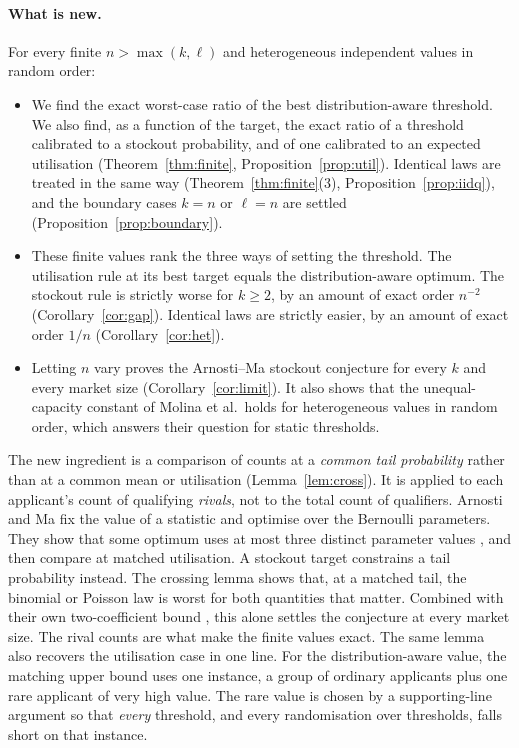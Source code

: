 \documentclass[11pt,a4paper]{article}
\theoremstyle{remark}
\begin{document}
\paragraph{What is new.}
For every finite $n>\max(k,\ell)$ and heterogeneous independent values in random order:
\begin{itemize}
\item We find the exact worst-case ratio of the best distribution-aware threshold. We also find, as a function of the target, the exact ratio of a threshold calibrated to a stockout probability, and of one calibrated to an expected utilisation (Theorem~\ref{thm:finite}, Proposition~\ref{prop:util}). Identical laws are treated in the same way (Theorem~\ref{thm:finite}(3), Proposition~\ref{prop:iidq}), and the boundary cases $k=n$ or $\ell=n$ are settled (Proposition~\ref{prop:boundary}).
\item These finite values rank the three ways of setting the threshold. The utilisation rule at its best target equals the distribution-aware optimum. The stockout rule is strictly worse for $k\ge2$, by an amount of exact order $n^{-2}$ (Corollary~\ref{cor:gap}). Identical laws are strictly easier, by an amount of exact order $1/n$ (Corollary~\ref{cor:het}).
\item Letting $n$ vary proves the Arnosti--Ma stockout conjecture for every $k$ and every market size (Corollary~\ref{cor:limit}). It also shows that the unequal-capacity constant of Molina et al.\ holds for heterogeneous values in random order, which answers their question for static thresholds.
\end{itemize}
The new ingredient is a comparison of counts at a \emph{common tail probability} rather than at a common mean or utilisation (Lemma~\ref{lem:cross}). It is applied to each applicant's count of qualifying \emph{rivals}, not to the total count of qualifiers. Arnosti and Ma fix the value of a statistic and optimise over the Bernoulli parameters. They show that some optimum uses at most three distinct parameter values \cite[Theorem~4]{am}, and then compare at matched utilisation. A stockout target constrains a tail probability instead. The crossing lemma shows that, at a matched tail, the binomial or Poisson law is worst for both quantities that matter. Combined with their own two-coefficient bound \cite[Lemma~1]{am}, this alone settles the conjecture at every market size. The rival counts are what make the finite values exact. The same lemma also recovers the utilisation case in one line. For the distribution-aware value, the matching upper bound uses one instance, a group of ordinary applicants plus one rare applicant of very high value. The rare value is chosen by a supporting-line argument so that \emph{every} threshold, and every randomisation over thresholds, falls short on that instance.
\end{document}
